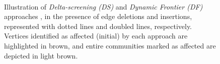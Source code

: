 \begin{figure}[hbtp]
  \centering
   \\[-1ex]
  \caption{Illustration of \textit{Delta-screening (DS)} \cite{com-zarayeneh21} and \textit{Dynamic Frontier (DF)} approaches \cite{sahu2024shared}, in the presence of edge deletions and insertions, represented with dotted lines and doubled lines, respectively. Vertices identified as affected (initial) by each approach are highlighted in brown, and entire communities marked as affected are depicted in light brown.}
  \label{fig:about-cases}
\end{figure}
